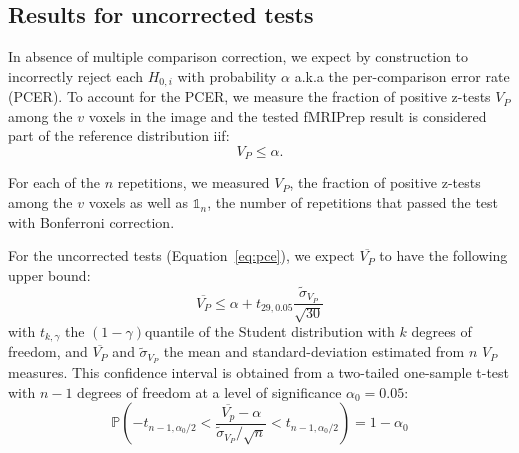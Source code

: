 \documentclass{article}
\newcommand{\fmriprep}{fMRIPrep \xspace}
\begin{document}
\begin{appendices}
    \section{Results for uncorrected tests}
    \label{appendix:multiple-comparison-tests}

    In absence of multiple comparison correction, we expect
    by construction to incorrectly reject each $H_{0,i}$ with probability $\alpha$ a.k.a
    the per-comparison error rate (PCER). To account for the PCER, we measure the
    fraction of positive z-tests $V_P$ among the $v$ voxels in the image and the
    tested \fmriprep result is considered part of the reference distribution iif:
    \begin{equation}
        \label{eq:pce}
        V_{P} \leq \alpha.
    \end{equation}

    For each of the $n$ repetitions,
    we measured $V_P$, the fraction of
    positive z-tests among the $v$ voxels as well as $\mathds{1}_n$, the number of repetitions
    that passed the test with Bonferroni correction.

    For the uncorrected tests (Equation~\ref{eq:pce}), we expect $\overline{V_P}$ to have
    the following upper bound:
    \[
        \overline{V_P} \leq
        \alpha  + t_{29,0.05} \frac{\tilde{\sigma}_{V_P}}{\sqrt{30}}
    \]
    with
    $t_{k,\gamma}$ the $(1-\gamma)$quantile of the Student distribution with $k$ degrees of freedom,
    and $\overline{V_P}$ and $\tilde{\sigma}_{V_P}$ the mean and standard-deviation estimated from
    $n$ $V_P$ measures.
    This confidence interval is obtained from a two-tailed one-sample
    t-test with $n-1$ degrees of freedom at a level of significance $\alpha_0=0.05$:
    \[
        \mathbb{P}
        \left(
        -t_{n-1,\alpha_0/2}
        <
        \dfrac{\overline{V_p} - \alpha}{\tilde{\sigma}_{V_P} / \sqrt{n}}
        <
        t_{n-1,\alpha_0/2}
        \right)
        = 1 - \alpha_0
    \]




\end{appendices}
\end{document}
